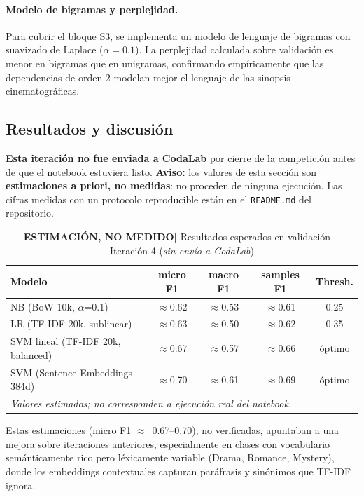 \documentclass[11pt, a4paper]{article}
\begin{document}
\paragraph{Modelo de bigramas y perplejidad.}
Para cubrir el bloque S3, se implementa un modelo de lenguaje de bigramas con suavizado de Laplace ($\alpha=0.1$). La perplejidad calculada sobre validación es menor en bigramas que en unigramas, confirmando empíricamente que las dependencias de orden 2 modelan mejor el lenguaje de las sinopsis cinematográficas.

\subsection{Resultados y discusión}

\textbf{Esta iteración no fue enviada a CodaLab} por cierre de la competición antes de que el notebook estuviera listo. \textbf{Aviso:} los valores de esta sección son \textbf{estimaciones a priori, no medidas}: no proceden de ninguna ejecución. Las cifras medidas con un protocolo reproducible están en el \texttt{README.md} del repositorio.

\begin{table}[H]
\centering
\caption{\textbf{[ESTIMACIÓN, NO MEDIDO]} Resultados esperados en validación --- Iteración 4 (\textit{sin envío a CodaLab})}
\small
\begin{tabularx}{\textwidth}{Xcccc}
\toprule
\textbf{Modelo} & \textbf{micro F1} & \textbf{macro F1} & \textbf{samples F1} & \textbf{Thresh.} \\
\midrule
NB (BoW 10k, $\alpha$=0.1)            & $\approx$0.62 & $\approx$0.53 & $\approx$0.61 & 0.25 \\
LR (TF-IDF 20k, sublinear)            & $\approx$0.63 & $\approx$0.50 & $\approx$0.62 & 0.35 \\
SVM lineal (TF-IDF 20k, balanced)     & $\approx$0.67 & $\approx$0.57 & $\approx$0.66 & óptimo \\
SVM (Sentence Embeddings 384d)        & $\approx$0.70 & $\approx$0.61 & $\approx$0.69 & óptimo \\
\bottomrule
\multicolumn{5}{p{\dimexpr\textwidth-2\tabcolsep}}{\small \textit{Valores estimados; no corresponden a ejecución real del notebook.}}
\end{tabularx}
\end{table}

Estas estimaciones (micro F1 $\approx$~0.67--0.70), no verificadas, apuntaban a una mejora sobre iteraciones anteriores, especialmente en clases con vocabulario semánticamente rico pero léxicamente variable (Drama, Romance, Mystery), donde los embeddings contextuales capturan paráfrasis y sinónimos que TF-IDF ignora.
\end{document}
